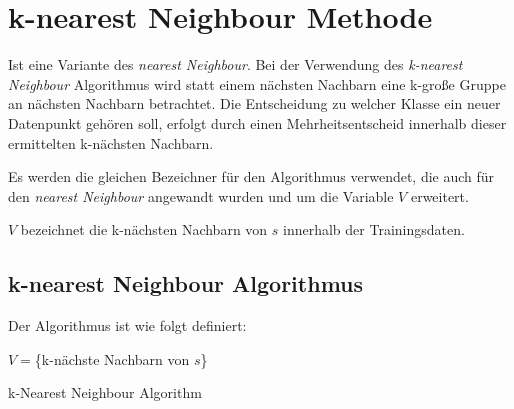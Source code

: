 \documentclass[fontsize=11pt]{scrartcl}
\begin{document}
        \section{k-nearest Neighbour Methode}
            Ist eine Variante des \emph{nearest Neighbour}. Bei der Verwendung des \emph{k-nearest Neighbour} Algorithmus wird statt einem nächsten Nachbarn eine k-große Gruppe an nächsten Nachbarn betrachtet. Die Entscheidung zu welcher Klasse ein neuer Datenpunkt gehören soll, erfolgt durch einen Mehrheitsentscheid innerhalb dieser ermittelten k-nächsten Nachbarn.\cite{ertel2016}\par
            Es werden die gleichen Bezeichner für den Algorithmus verwendet, die auch für den \emph{nearest Neighbour} angewandt wurden und um die Variable $V$ erweitert.\par $V$ bezeichnet die k-nächsten Nachbarn von $s$ innerhalb der Trainingsdaten.
        
                           
            \subsection{k-nearest Neighbour Algorithmus}
                Der Algorithmus ist wie folgt definiert:\par
                \begin{algorithm}[H]
                    $V= $\{k-nächste Nachbarn von $s$\}\;
                    {
                        \;
                    }
                           
                    \caption{k-Nearest Neighbour Algorithm}
                \end{algorithm}\par
                
\end{document}
